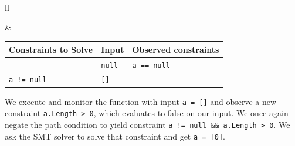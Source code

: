 \documentclass[11pt]{article}
\begin{document}
\begin{center}
  \begin{tabular}{ll}
    \begin{minipage}{.3\textwidth}
      \begin{center}
\begin{tikzpicture}[
        node distance=1.5cm and 1cm,
        every node/.style={draw, rounded corners, fill=gray!10, align=center},
        every path/.style={thick},
        decision/.style={draw, rounded corners, fill=gray!20, align=center, minimum width=3.5cm, yshift=2em}
    ]


  \node (start) {\texttt{a == null}};
  \node (left) [below left=of start, text width=0.1em,yshift=2em] {};
  \node (right) [below right=of start, text width=0.1em,yshift=2em] {};

  \draw[->] (start) -- (right);
  \draw[->,dotted] (start) -- (left);
\end{tikzpicture}
      \end{center}
    \end{minipage}
&
    \begin{minipage}{.45\textwidth}
\begin{tabular}{l|l|l}
  Constraints to Solve & Input & Observed constraints\\ \hline
   & \texttt{null} & \texttt{a == null}\\ \hline
\texttt{a != null} & \texttt{[]}
\end{tabular}
    \end{minipage}
  \end{tabular}
\end{center}
We execute and monitor the function with input \texttt{a = []} and observe a new constraint
\texttt{a.Length > 0}, which evaluates to false on our input.
We once again negate the path condition to yield constraint \texttt{a != null \&\& a.Length > 0}.
We ask the SMT solver to solve that constraint and get \texttt{a = [0]}.
\end{document}
